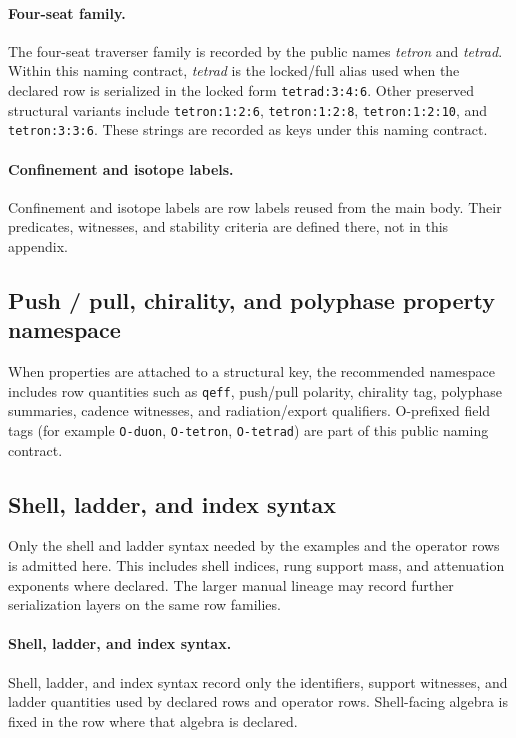 \paragraph{Four-seat family.} The four-seat traverser family is recorded by the public names \emph{tetron} and \emph{tetrad}. Within this naming contract, \emph{tetrad} is the locked/full alias used when the declared row is serialized in the locked form \texttt{tetrad:3:4:6}. Other preserved structural variants include \texttt{tetron:1:2:6}, \texttt{tetron:1:2:8}, \texttt{tetron:1:2:10}, and \texttt{tetron:3:3:6}. These strings are recorded as keys under this naming contract.

\paragraph{Confinement and isotope labels.} Confinement and isotope labels are row labels reused from the main body. Their predicates, witnesses, and stability criteria are defined there, not in this appendix.

\subsection{Push / pull, chirality, and polyphase property namespace}
When properties are attached to a structural key, the recommended namespace includes row quantities such as \texttt{qeff}, push/pull polarity, chirality tag, polyphase summaries, cadence witnesses, and radiation/export qualifiers. O-prefixed field tags (for example \texttt{O-duon}, \texttt{O-tetron}, \texttt{O-tetrad}) are part of this public naming contract.

\subsection{Shell, ladder, and index syntax}
Only the shell and ladder syntax needed by the examples and the operator rows is admitted here. This includes shell indices, rung support mass, and attenuation exponents where declared. The larger manual lineage may record further serialization layers on the same row families.

\paragraph{Shell, ladder, and index syntax.}
Shell, ladder, and index syntax record only the identifiers, support witnesses, and ladder quantities used by declared rows and operator rows. Shell-facing algebra is fixed in the row where that algebra is declared.

